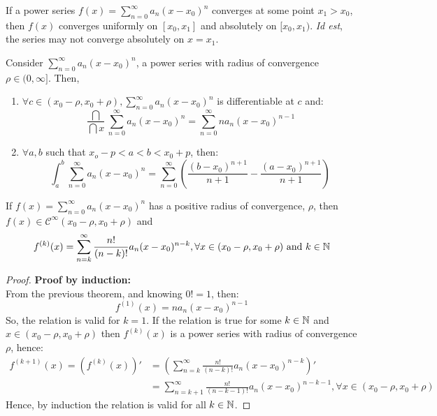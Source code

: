 \begin{remark}
    If a power series $f(x) = \sum_{n=0}^\infty a_n (x - x_0)^n$ converges at some point $x_1 > x_0$, then $f(x)$ converges uniformly on $[x_0, x_1]$ and absolutely on $[x_0, x_1)$. \emph{Id est}, the series may not converge absolutely on $x = x_1$.
\end{remark}

\begin{theorem}
    Consider $\sum_{n=0}^\infty a_n(x - x_0)^n$, a power series with radius of convergence $\rho \in (0, \infty]$. Then,
    \begin{enumerate}
        \item $\forall c \in (x_0 - \rho, x_0 + \rho), \sum_{n=0}^\infty a_n(x - x_0)^n$ is differentiable at $c$ and:
            \begin{equation*}
                \frac{\dint}{\dint x} \sum \limits_{n=0}^\infty a_n(x - x_0)^n = \sum \limits_{n=0}^\infty n a_n (x - x_0)^{n-1}
            \end{equation*}
        \item $\forall a, b$ such that $x_o - p < a <  b < x_0 + p$, then:
            \begin{equation*}
                \int_a^b \sum \limits_{n = 0}^\infty a_n(x- x_0)^n = \sum \limits_{n=0}^\infty \left(
                    \frac{(b-x_0)^{n+1}}{n+1} - \frac{(a - x_0)^{n+1}}{n + 1}
                \right)
            \end{equation*}
    \end{enumerate}
\end{theorem}

\begin{corollary}
    If $f(x) = \sum_{n=0}^\infty a_n (x-x_0)^n$ has a positive radius of convergence, $\rho$, then $f(x) \in \mathcal{C}^\infty(x_0 - \rho, x_0 + \rho)$ and
    \begin{equation*}
        f^{(k)}(x) = \sum \limits_{n = k}^\infty \frac{n!}{(n-k)!}a_n (x - x_0)^{n-k}, \forall x \in (x_0 - \rho, x_0 + \rho) \text{ and } k \in \mathbb{N}
    \end{equation*}
\end{corollary}

\begin{proof}
    \textbf{Proof by induction:}\\
    From the previous theorem, and knowing $0! = 1$, then:
    \begin{equation*}
        f^{(1)}(x) = n a_n (x - x_0)^{n-1}
    \end{equation*}
    So, the relation is valid for $k = 1$. If the relation is true for some $k \in \mathbb{N}$ and $x \in (x_0 - \rho, x_0 + \rho)$ then $f^{(k)}(x)$ is a power series with radius of convergence $\rho$, hence:
    \begin{align*}
        f^{(k+1)}(x) = (f^{(k)}(x))' &= \left(
            \sum \limits_{n=k}^\infty \frac{n!}{(n-k)!}a_n (x-x_0)^{n-k}
        \right)' \\
        &= \sum \limits_{n = k + 1}^\infty \frac{n!}{(n-k-1)!}a_n (x - x_0)^{n-k-1}, \forall x \in (x_0 - \rho, x_0 + \rho)
    \end{align*}
    Hence, by induction the relation is valid for all $k \in \mathbb{N}$.
\end{proof}

